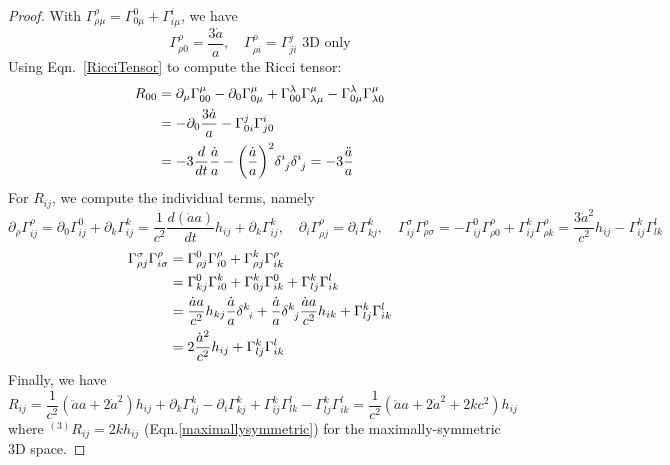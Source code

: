 \documentclass[a4paper]{article}
\theoremstyle{new}
\begin{document}
\begin{proof}
With $\Gamma^\rho_{\rho\mu}=\Gamma^0_{0\mu}+\Gamma^i_{i\mu}$, we have
$$\Gamma^\rho_{\rho0}=\frac{3\dot{a}}{a},\quad\Gamma^\rho_{\rho i}=\Gamma^j_{ji}\text{ 3D only}$$
Using Eqn.~\ref{RicciTensor} to compute the Ricci tensor:
\begin{align}
    R_{00}&=\partial_\mu\Gamma^\mu_{00}-\partial_0\Gamma^\mu_{0\mu}+\Gamma^\lambda_{00}\Gamma^\mu_{\lambda\mu}-\Gamma^\lambda_{0\mu}\Gamma^\mu_{\lambda0}\nonumber\\&=-\partial_0\frac{3\dot{a}}{a}-\Gamma^j_{0i}\Gamma^i_{j0}\nonumber\\&=-3\frac{d}{dt}\frac{\dot{a}}{a}-\bigg(\frac{\dot{a}}{a}\bigg)^2\tensor*{\delta}{*_{}^{i}_{j}}\tensor*{\delta}{*_{}^{i}_{j}}=-3\frac{\ddot{a}}{a}\nonumber
\end{align}
For $R_{ij}$, we compute the individual terms, namely
$$\partial_\rho\Gamma^\rho_{ij}=\partial_0\Gamma^0_{ij}+\partial_k\Gamma^k_{ij}=\frac{1}{c^2}\frac{d(\dot{a}a)}{dt}h_{ij}+\partial_k\Gamma^k_{ij},\quad\partial_i\Gamma^\rho_{\rho j}=\partial_i\Gamma^k_{kj},\quad\Gamma^\sigma_{ij}\Gamma^\rho_{\rho\sigma}=-\Gamma^0_{ij}\Gamma^\rho_{\rho0}+\Gamma_{ij}^k\Gamma^\rho_{\rho k}=\frac{3\dot{a}^2}{c^2}h_{ij}-\Gamma^k_{ij}\Gamma^l_{lk}$$
\begin{align}
\Gamma^\sigma_{\rho j}\Gamma^\rho_{i\sigma}&=\Gamma^0_{\rho j}\Gamma^\rho_{i0}+\Gamma^k_{\rho j}\Gamma^\rho_{ik}\nonumber\\&=\Gamma^0_{kj}\Gamma^k_{i0}+\Gamma^k_{0 j}\Gamma^0_{ik}+\Gamma^k_{lj}\Gamma^l_{ik}\nonumber\\&=\frac{\dot{a}a}{c^2}h_{kj}\frac{\dot{a}}{a}\tensor*{\delta}{*_{}^{k}_{i}}+\frac{\dot{a}}{a}\tensor*{\delta}{*_{}^{k}_{j}}\frac{\dot{a}a}{c^2}h_{ik}+\Gamma^k_{lj}\Gamma^l_{ik}\nonumber\\&=2\frac{\dot{a}^2}{c^2}h_{ij}+\Gamma^k_{lj}\Gamma^l_{ik}\nonumber
\end{align}
Finally, we have
$$R_{ij}=\frac{1}{c^2}(\ddot{a}a+2\dot{a}^2)h_{ij}+\partial_k\Gamma^k_{ij}-\partial_i\Gamma^k_{kj}+\Gamma^k_{ij}\Gamma^l_{lk}-\Gamma^k_{lj}\Gamma^l_{ik}=\frac{1}{c^2}(\ddot{a}a+2\dot{a}^2+2kc^2)h_{ij}$$
where $^{(3)}R_{ij}=2kh_{ij}$ (Eqn.\ref{maximallysymmetric}) for the maximally-symmetric 3D space.
\end{proof}
\end{document}

